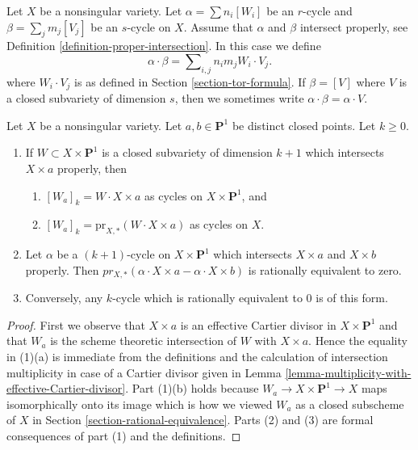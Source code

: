 \noindent
Let $X$ be a nonsingular variety. Let
$\alpha = \sum n_i [W_i]$ be an $r$-cycle and
$\beta = \sum_j m_j [V_j]$ be an $s$-cycle on $X$.
Assume that $\alpha$ and $\beta$ intersect properly, see
Definition \ref{definition-proper-intersection}.
In this case we define
$$
\alpha \cdot \beta = \sum\nolimits_{i,j} n_i m_j W_i \cdot V_j.
$$
where $W_i \cdot V_j$ is as defined in Section \ref{section-tor-formula}.
If $\beta = [V]$ where $V$ is a closed subvariety of dimension $s$,
then we sometimes write $\alpha \cdot \beta = \alpha \cdot V$.

\begin{lemma}
\label{lemma-rational-equivalence-and-intersection}
Let $X$ be a nonsingular variety. Let $a, b \in \mathbf{P}^1$
be distinct closed points. Let $k \geq 0$.
\begin{enumerate}
\item If $W \subset X \times \mathbf{P}^1$ is a closed subvariety
of dimension $k + 1$ which intersects $X \times a$ properly, then
\begin{enumerate}
\item $[W_a]_k = W \cdot X \times a$ as cycles on $X \times \mathbf{P}^1$, and
\item $[W_a]_k = \text{pr}_{X, *}(W \cdot X \times a)$ as cycles on $X$.
\end{enumerate}
\item Let $\alpha$ be a $(k + 1)$-cycle on $X \times \mathbf{P}^1$
which intersects $X \times a$ and $X \times b$ properly. Then
$pr_{X,*}( \alpha \cdot X \times a - \alpha \cdot X \times b)$
is rationally equivalent to zero.
\item Conversely, any $k$-cycle which is
rationally equivalent to $0$ is of this form.
\end{enumerate}
\end{lemma}

\begin{proof}
First we observe that $X \times a$ is an effective Cartier divisor in
$X \times \mathbf{P}^1$ and that $W_a$ is the scheme theoretic intersection
of $W$ with $X \times a$. Hence the equality in (1)(a) is
immediate from the definitions and the calculation of intersection
multiplicity in case of a Cartier divisor given in
Lemma \ref{lemma-multiplicity-with-effective-Cartier-divisor}.
Part (1)(b) holds because $W_a \to X \times \mathbf{P}^1 \to X$ maps
isomorphically onto its image which is how we viewed $W_a$
as a closed subscheme of $X$ in Section \ref{section-rational-equivalence}.
Parts (2) and (3) are formal consequences of part (1) and the definitions.
\end{proof}

